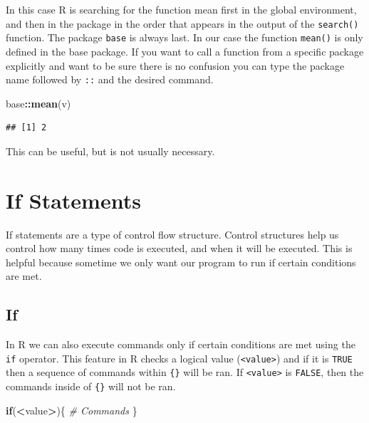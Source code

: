 \documentclass[
]{book}
\newenvironment{Shaded}{\begin{snugshade}}{\end{snugshade}}
\newcommand{\CommentTok}[1]{\textcolor[rgb]{0.56,0.35,0.01}{\textit{#1}}}
\newcommand{\ControlFlowTok}[1]{\textcolor[rgb]{0.13,0.29,0.53}{\textbf{#1}}}
\newcommand{\KeywordTok}[1]{\textcolor[rgb]{0.13,0.29,0.53}{\textbf{#1}}}
\newcommand{\NormalTok}[1]{#1}
\newcommand{\OperatorTok}[1]{\textcolor[rgb]{0.81,0.36,0.00}{\textbf{#1}}}
\begin{document}
In this case R is searching for the function mean first in the global environment, and then in the package in the order that appears in the output of the \texttt{search()} function. The package \texttt{base} is always last. In our case the function \texttt{mean()} is only defined in the base package. If you want to call a function from a specific package explicitly and want to be sure there is no confusion you can type the package name followed by \texttt{::} and the desired command.

\begin{Shaded}
\begin{Highlighting}[]
\NormalTok{base}\OperatorTok{::}\KeywordTok{mean}\NormalTok{(v)}
\end{Highlighting}
\end{Shaded}

\begin{verbatim}
## [1] 2
\end{verbatim}

This can be useful, but is not usually necessary.

\hypertarget{if-statements}{%
\chapter{If Statements}\label{if-statements}}

If statements are a type of control flow structure. Control structures help us control how many times code is executed, and when it will be executed. This is helpful because sometime we only want our program to run if certain conditions are met.

\hypertarget{if}{%
\section{If}\label{if}}

In R we can also execute commands only if certain conditions are met using the \texttt{if} operator. This feature in R checks a logical value (\texttt{\textless{}value\textgreater{}}) and if it is \texttt{TRUE} then a sequence of commands within \texttt{\{\}} will be ran. If \texttt{\textless{}value\textgreater{}} is \texttt{FALSE}, then the commands inside of \texttt{\{\}} will not be ran.

\begin{Shaded}
\begin{Highlighting}[]
\ControlFlowTok{if}\NormalTok{(}\OperatorTok{<}\NormalTok{value}\OperatorTok{>}\NormalTok{)\{}
  \CommentTok{# Commands }
\NormalTok{\}}
\end{Highlighting}
\end{Shaded}
\end{document}
